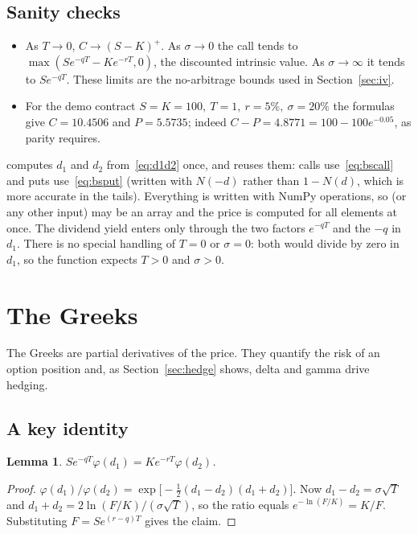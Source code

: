 \documentclass[11pt,a4paper]{article}
\newcommand{\npdf}{\varphi}
\newcommand{\fn}[1]{\texttt{\detokenize{#1}}}   %
\theoremstyle{plain}
\newtheorem*{lemma}{Lemma}
\theoremstyle{remark}
\begin{document}
\subsection{Sanity checks}

\begin{itemize}[nosep]
\item As $T\to0$, $C\to(S-K)^+$. As $\sigma\to0$ the call tends to $\max(Se^{-qT}-Ke^{-rT},0)$,
      the discounted intrinsic value. As $\sigma\to\infty$ it tends to $Se^{-qT}$.
      These limits are the no-arbitrage bounds used in Section~\ref{sec:iv}.
\item For the demo contract $S=K=100,\ T=1,\ r=5\%,\ \sigma=20\%$ the formulas give
      $C=10.4506$ and $P=5.5735$; indeed $C-P=4.8771=100-100e^{-0.05}$, as parity requires.
\end{itemize}

\begin{codenote}
\fn{_d1_d2} computes $d_1$ and $d_2$ from~\eqref{eq:d1d2} once, and \fn{bs_price}
reuses them: calls use~\eqref{eq:bscall} and puts use~\eqref{eq:bsput}
(written with $N(-d)$ rather than $1-N(d)$, which is more accurate in the tails).
Everything is written with NumPy operations, so \fn{S} (or any other input) may be an
array and the price is computed for all elements at once. The dividend yield
enters only through the two factors $e^{-qT}$ and the $-q$ in $d_1$. There is no
special handling of $T=0$ or $\sigma=0$: both would divide by zero in $d_1$,
so the function expects $T>0$ and $\sigma>0$.
\end{codenote}

\section{The Greeks}\label{sec:greeks}

The Greeks are partial derivatives of the price. They quantify the risk of an option
position and, as Section~\ref{sec:hedge} shows, delta and gamma drive hedging.

\subsection{A key identity}

\begin{lemma}
$Se^{-qT}\npdf(d_1)=Ke^{-rT}\npdf(d_2)$.
\end{lemma}
\begin{proof}
$\npdf(d_1)/\npdf(d_2)=\exp\!\big[-\tfrac12(d_1-d_2)(d_1+d_2)\big]$. Now $d_1-d_2=\sigma\sqrt T$ and
$d_1+d_2=2\ln(F/K)/(\sigma\sqrt T)$, so the ratio equals $e^{-\ln(F/K)}=K/F$.
Substituting $F=Se^{(r-q)T}$ gives the claim.
\end{proof}
\end{document}

